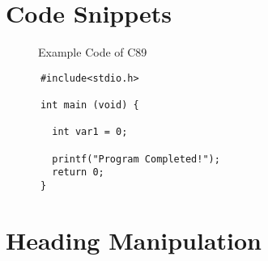 \documentclass[12pt, a4paper]{article}
\begin{document}
  \section{Code Snippets}

    \begin{figure}[H]
      \lstset{style = mystyle}
      
      \caption{Example Code of C89}
    \end{figure}

    \begin{verbatim}
      #include<stdio.h>

      int main (void) {

        int var1 = 0;

        printf("Program Completed!");
        return 0;
      }
    \end{verbatim}

  \section{Heading Manipulation}
\end{document}
